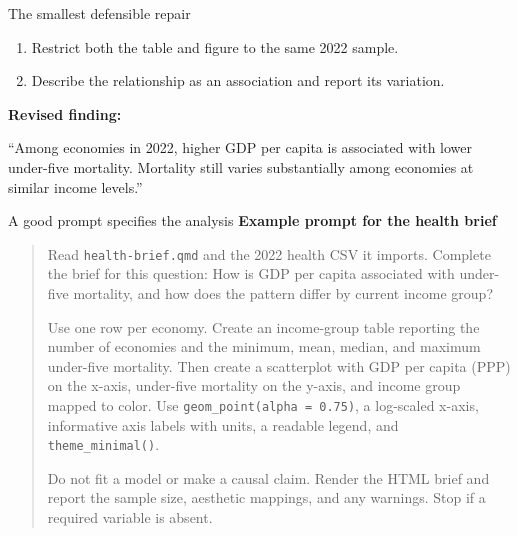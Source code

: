 \begin{frame}{The smallest defensible repair}
\begin{enumerate}
\item Restrict both the table and figure to the same 2022 sample.
\item Describe the relationship as an association and report its variation.
\end{enumerate}
\vspace{0.3cm}
\textbf{Revised finding:}
\vspace{0.15cm}

``Among economies in 2022, higher GDP per capita is associated with lower under-five mortality. Mortality still varies substantially among economies at similar income levels.''
\end{frame}

\begin{frame}{A good prompt specifies the analysis}
\small
\textbf{Example prompt for the health brief}
\vspace{0.15cm}

\begin{quote}
Read \texttt{health-brief.qmd} and the 2022 health CSV it imports. Complete the brief for this question: How is GDP per capita associated with under-five mortality, and how does the pattern differ by current income group?

Use one row per economy. Create an income-group table reporting the number of economies and the minimum, mean, median, and maximum under-five mortality. Then create a scatterplot with GDP per capita (PPP) on the x-axis, under-five mortality on the y-axis, and income group mapped to color. Use \texttt{geom\_point(alpha = 0.75)}, a log-scaled x-axis, informative axis labels with units, a readable legend, and \texttt{theme\_minimal()}.

Do not fit a model or make a causal claim. Render the HTML brief and report the sample size, aesthetic mappings, and any warnings. Stop if a required variable is absent.
\end{quote}
\end{frame}
